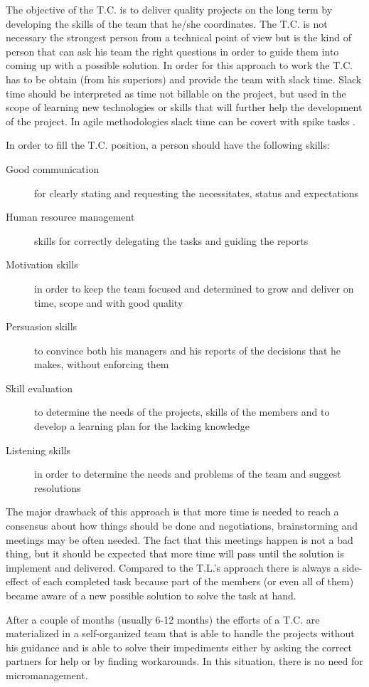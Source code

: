 The objective of the T.C. is to deliver quality projects on the long term by developing the skills of the team that he/she coordinates. The T.C. is not necessary the strongest person from a technical point of view but is the kind of person that can ask his team the right questions in order to guide them into coming up with a possible solution.  In order for this approach to work the T.C. has to be obtain (from his superiors) and provide the team with slack time. Slack time should be interpreted as time not billable on the project, but used in the scope of learning new technologies or skills that will further help the development of the project. In agile methodologies slack time can be covert with spike tasks \cite{spike}.

In order to fill the T.C. position, a person should have the following skills:
\begin{description}
\item [Good communication] for clearly stating and requesting the necessitates, status and expectations
\item [Human resource management] skills for correctly delegating the tasks and guiding the reports
\item [Motivation skills] in order to keep the team focused and determined to grow and deliver on time, scope and with good quality
\item [Persuasion skills] to convince both his managers and his reports of the decisions that he makes, without enforcing them
\item [Skill evaluation] to determine the needs of the projects, skills of the members and to develop a learning plan for the lacking knowledge
\item [Listening skills] in order to determine the needs and problems of the team and suggest resolutions
\end{description}

The major drawback of this approach is that more time is needed to reach a consensus about how things should be done and negotiations, brainstorming and meetings may be often needed. The fact that this meetings happen is not a bad thing, but it should be expected that more time will pass until the solution is implement and delivered. Compared to the T.L.'s approach there is always a side-effect of each completed task because part of the members (or even all of them) became aware of a new possible solution to solve the task at hand. 

After a couple of months (usually 6-12 months) the efforts of a T.C. are materialized in a self-organized team that is able to handle the projects without his guidance and is able to solve their impediments either by asking the correct partners for help or by finding workarounds. In this situation, there is no need for micromanagement.

